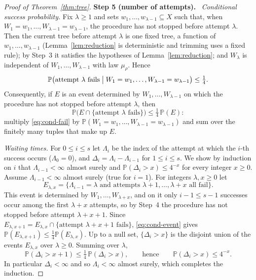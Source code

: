 \documentclass[11pt]{article}
\numberwithin{equation}{section}
\newcommand{\PP}{\mathbb P}
\newcommand{\step}[2]{\par\medskip\noindent\textbf{Step #1 (#2).}\ }
\begin{document}
\begin{proof}[Proof of Theorem~\ref{thm:tree}]
\step{5}{number of attempts}
\emph{Conditional success probability.} Fix $\lambda\ge1$ and sets
$w_1,\ldots,w_{\lambda-1}\subseteq X$ such that, when
$W_1=w_1,\ldots,W_{\lambda-1}=w_{\lambda-1}$, the procedure has not
stopped before attempt $\lambda$. Then the current tree before attempt
$\lambda$ is one fixed tree, a function of
$w_1,\ldots,w_{\lambda-1}$ (Lemma~\ref{lem:reduction} is deterministic
and trimming uses a fixed rule); by Step~3 it satisfies the hypotheses
of Lemma~\ref{lem:reduction}; and $W_\lambda$ is independent of
$W_1,\ldots,W_{\lambda-1}$ with law $\mu_\rho$. Hence
\begin{equation}\label{eq:cond-fail}
 \PP\bigl(\text{attempt }\lambda\text{ fails}\bigm|
 W_1=w_1,\ldots,W_{\lambda-1}=w_{\lambda-1}\bigr)\le\tfrac14 .
\end{equation}
Consequently, if $E$ is an event determined by
$W_1,\ldots,W_{\lambda-1}$ on which the procedure has not stopped before
attempt $\lambda$, then
\begin{equation}\label{eq:cond-event}
 \PP\bigl(E\cap\{\text{attempt }\lambda\text{ fails}\}\bigr)
 \le\tfrac14\,\PP(E):
\end{equation}
multiply \eqref{eq:cond-fail} by
$\PP(W_1=w_1,\ldots,W_{\lambda-1}=w_{\lambda-1})$ and sum over the
finitely many tuples that make up $E$.

\emph{Waiting times.} For $0\le i\le s$ let $\Lambda_i$ be the index of
the attempt at which the $i$-th success occurs ($\Lambda_0=0$), and
$\Delta_i=\Lambda_i-\Lambda_{i-1}$ for $1\le i\le s$. We show by
induction on $i$ that $\Lambda_{i-1}<\infty$ almost surely and
$\PP(\Delta_i>x)\le4^{-x}$ for every integer $x\ge0$. Assume
$\Lambda_{i-1}<\infty$ almost surely (true for $i=1$). For integers
$\lambda,x\ge0$ let
\[
 E_{\lambda,x}=\{\Lambda_{i-1}=\lambda\text{ and attempts }
 \lambda+1,\ldots,\lambda+x\text{ all fail}\}.
\]
This event is determined by $W_1,\ldots,W_{\lambda+x}$, and on it only
$i-1\le s-1$ successes occur among the first $\lambda+x$ attempts, so
by Step~4 the procedure has not stopped before attempt $\lambda+x+1$.
Since
$E_{\lambda,x+1}=E_{\lambda,x}\cap\{\text{attempt }\lambda+x+1
\text{ fails}\}$, \eqref{eq:cond-event} gives
$\PP(E_{\lambda,x+1})\le\frac14\PP(E_{\lambda,x})$. Up to a null set,
$\{\Delta_i>x\}$ is the disjoint union of the events $E_{\lambda,x}$
over $\lambda\ge0$. Summing over $\lambda$,
\[
 \PP(\Delta_i>x+1)\le\tfrac14\,\PP(\Delta_i>x),
 \qquad\text{hence}\qquad\PP(\Delta_i>x)\le4^{-x}.
\]
In particular $\Delta_i<\infty$ and so $\Lambda_i<\infty$ almost
surely, which completes the induction.


\end{proof}
\end{document}
